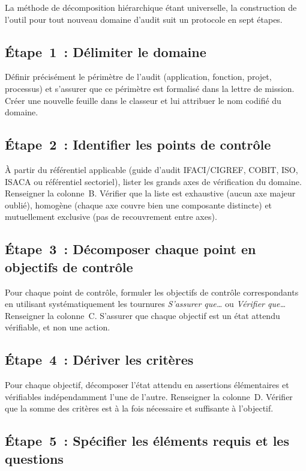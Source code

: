 La méthode de décomposition hiérarchique étant universelle, la construction de
l'outil pour tout nouveau domaine d'audit suit un protocole en sept étapes.

\subsection{Étape~1~: Délimiter le domaine}

Définir précisément le périmètre de l'audit (application, fonction, projet,
processus) et s'assurer que ce périmètre est formalisé dans la lettre de
mission. Créer une nouvelle feuille dans le classeur et lui attribuer le nom
codifié du domaine.

\subsection{Étape~2~: Identifier les points de contrôle}

À partir du référentiel applicable (guide d'audit IFACI/CIGREF, COBIT, ISO,
ISACA ou référentiel sectoriel), lister les grands axes de vérification du
domaine. Renseigner la colonne~B. Vérifier que la liste est exhaustive (aucun
axe majeur oublié), homogène (chaque axe couvre bien une composante
distincte) et mutuellement exclusive (pas de recouvrement entre axes).

\subsection{Étape~3~: Décomposer chaque point en objectifs de contrôle}

Pour chaque point de contrôle, formuler les objectifs de contrôle correspondants
en utilisant systématiquement les tournures \emph{S'assurer que\ldots} ou
\emph{Vérifier que\ldots} Renseigner la colonne~C. S'assurer que chaque
objectif est un état attendu vérifiable, et non une action.

\subsection{Étape~4~: Dériver les critères}

Pour chaque objectif, décomposer l'état attendu en assertions élémentaires et
vérifiables indépendamment l'une de l'autre. Renseigner la colonne~D. Vérifier
que la somme des critères est à la fois nécessaire et suffisante à l'objectif.

\subsection{Étape~5~: Spécifier les éléments requis et les questions}

